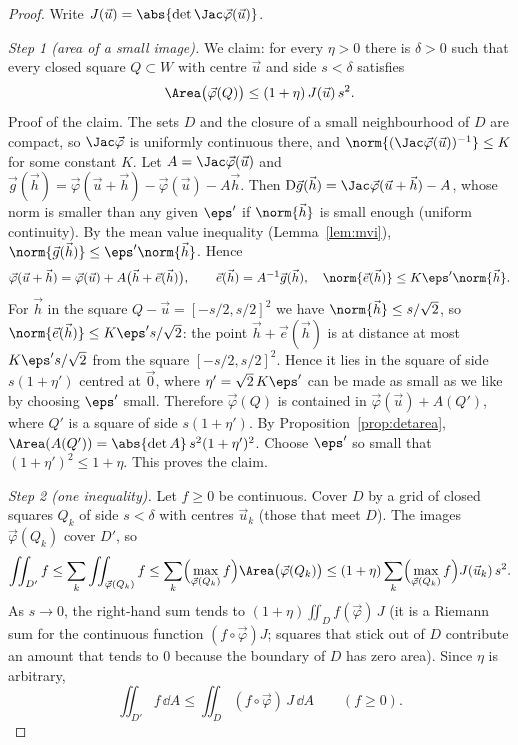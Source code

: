 \begin{proof}
Write $J(\vec u)=\abs{\det\Jac\vec\varphi(\vec u)}$.

\emph{Step 1 (area of a small image).} We claim: for every $\eta>0$ there is $\delta>0$ such that every closed square $Q\subset W$ with centre $\vec u$ and side $s<\delta$ satisfies
\[
\Area\bigl(\vec\varphi(Q)\bigr)\le(1+\eta)\,J(\vec u)\,s^2 .
\]
Proof of the claim. The sets $D$ and the closure of a small neighbourhood of $D$ are compact, so $\Jac\vec\varphi$ is uniformly continuous there, and $\norm{(\Jac\vec\varphi(\vec u))^{-1}}\le K$ for some constant $K$. Let $A=\Jac\vec\varphi(\vec u)$ and $\vec g(\vec h)=\vec\varphi(\vec u+\vec h)-\vec\varphi(\vec u)-A\vec h$. Then $\mathrm{D}\vec g(\vec h)=\Jac\vec\varphi(\vec u+\vec h)-A$, whose norm is smaller than any given $\eps'$ if $\norm{\vec h}$ is small enough (uniform continuity). By the mean value inequality (Lemma~\ref{lem:mvi}), $\norm{\vec g(\vec h)}\le\eps'\norm{\vec h}$. Hence
\[
\vec\varphi(\vec u+\vec h)=\vec\varphi(\vec u)+A\bigl(\vec h+\vec e(\vec h)\bigr),\qquad\vec e(\vec h)=A^{-1}\vec g(\vec h),\quad\norm{\vec e(\vec h)}\le K\eps'\norm{\vec h}.
\]
For $\vec h$ in the square $Q-\vec u=[-s/2,s/2]^2$ we have $\norm{\vec h}\le s/\sqrt2$, so $\norm{\vec e(\vec h)}\le K\eps's/\sqrt2$: the point $\vec h+\vec e(\vec h)$ is at distance at most $K\eps's/\sqrt2$ from the square $[-s/2,s/2]^2$. Hence it lies in the square of side $s(1+\eta')$ centred at $\vec 0$, where $\eta'=\sqrt2\,K\eps'$ can be made as small as we like by choosing $\eps'$ small. Therefore $\vec\varphi(Q)$ is contained in $\vec\varphi(\vec u)+A(Q')$, where $Q'$ is a square of side $s(1+\eta')$. By Proposition~\ref{prop:detarea}, $\Area(A(Q'))=\abs{\det A}\,s^2(1+\eta')^2$. Choose $\eps'$ so small that $(1+\eta')^2\le1+\eta$. This proves the claim.

\emph{Step 2 (one inequality).} Let $f\ge0$ be continuous. Cover $D$ by a grid of closed squares $Q_k$ of side $s<\delta$ with centres $\vec u_k$ (those that meet $D$). The images $\vec\varphi(Q_k)$ cover $D'$, so
\[
\iint_{D'}f\le\sum_k\iint_{\vec\varphi(Q_k)}f\le\sum_k\Bigl(\max_{\vec\varphi(Q_k)}f\Bigr)\Area\bigl(\vec\varphi(Q_k)\bigr)\le(1+\eta)\sum_k\Bigl(\max_{\vec\varphi(Q_k)}f\Bigr)J(\vec u_k)\,s^2 .
\]
As $s\to0$, the right-hand sum tends to $(1+\eta)\iint_Df(\vec\varphi)\,J$ (it is a Riemann sum for the continuous function $(f\circ\vec\varphi)J$; squares that stick out of $D$ contribute an amount that tends to $0$ because the boundary of $D$ has zero area). Since $\eta$ is arbitrary,
\[
\iint_{D'}f\,\dd A\le\iint_D(f\circ\vec\varphi)\,J\,\dd A\qquad(f\ge0).\tag{$*$}
\]


\end{proof}
